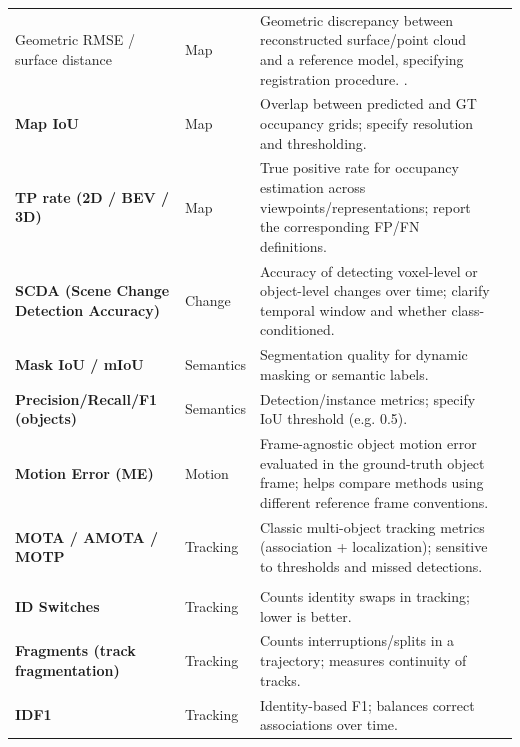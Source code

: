 \begin{table}[!htbp]
\begin{tabularx}{\textwidth}{@{}X l X@{} r}
\midrule

Geometric RMSE / surface distance & Map & 
Geometric discrepancy between reconstructed surface/point cloud and a reference model, specifying registration procedure. . 
& \cite{rosinol_kimera_2021} \cite{yan_dynamic_2025}\\
\textbf{Map IoU} & Map & Overlap between predicted and GT occupancy grids; specify resolution and thresholding. 
& \cite{rosinol_kimera_2021}\\
\textbf{TP rate (2D / BEV / 3D)} & Map &
True positive rate for occupancy estimation across viewpoints/representations; report the corresponding FP/FN definitions. 
& \cite{zhang_semantic-integrated_2026} \cite{bescos_dynaslam_2021}\\
\textbf{SCDA (Scene Change Detection Accuracy)} & Change &
Accuracy of detecting voxel-level or object-level changes over time; clarify temporal window and whether class-conditioned. 
& \cite{yan_dynamic_2025}\\

\midrule

\textbf{Mask IoU / mIoU} & Semantics & 
Segmentation quality for dynamic masking or semantic labels. 
& \cite{rosinol_kimera_2021}\\
\textbf{Precision/Recall/F1 (objects)} & Semantics & 
Detection/instance metrics; specify IoU threshold (e.g. 0.5). 
& \cite{schmid_khronos_2024}\\
\textbf{Motion Error (ME)} & Motion &
Frame-agnostic object motion error evaluated in the ground-truth object frame; helps compare methods using different reference frame conventions. 
& \cite{morris_dynosam_2025} \cite{morris_online_2025}\\

\midrule

\textbf{MOTA / AMOTA / MOTP} & Tracking &
Classic multi-object tracking metrics (association + localization); sensitive to thresholds and missed detections. 
& \makecell{\cite{gou_visual_2024} \cite{tian_dl-slot_2024} \cite{zaech_learnable_2022} \\ \cite{zhang_semantic-integrated_2026} \cite{gou_visual_2024} \cite{bescos_dynaslam_2021}} \\
\textbf{ID Switches} & Tracking &
Counts identity swaps in tracking; lower is better. 
& \cite{zhang_semantic-integrated_2026} \cite{zaech_learnable_2022}\\
\textbf{Fragments (track fragmentation)} & Tracking &
Counts interruptions/splits in a trajectory; measures continuity of tracks. 
& \cite{zhang_semantic-integrated_2026}\\
\textbf{IDF1} & Tracking &
Identity-based F1; balances correct associations over time. 
& \cite{zhang_semantic-integrated_2026}\\


\end{tabularx}
\end{table}
